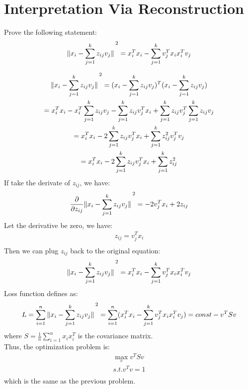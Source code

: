 \documentclass[12pt]{article}
\begin{document}
\section{Interpretation Via Reconstruction}
Prove the following statement:
\begin{gather*}
    \norm*{x_i - \sum_{j=1}^{k}z_{ij}v_j}^2 = x_{i}^T x_{i} - \sum_{j=1}^{k}v_{j}^T x_{i} x_{i}^T v_{j} \\
\end{gather*}
\begin{qsolve}
    \begin{gather*}
        \norm*{x_i - \sum_{j=1}^{k}z_{ij}v_j}^2 = (x_i - \sum_{j=1}^{k}z_{ij}v_j)^T (x_i - \sum_{j=1}^{k}z_{ij}v_j) \\
        = x_i^T x_i - x_i^T \sum_{j=1}^{k}z_{ij}v_j - \sum_{j=1}^{k}z_{ij}v_j^T x_i + \sum_{j=1}^{k}z_{ij}v_j^T \sum_{j=1}^{k}z_{ij}v_j \\
        = x_i^T x_i - 2 \sum_{j=1}^{k}z_{ij}v_j^T x_i + \sum_{j=1}^{k}z_{ij}^2 v_j^T v_j \\
        = x_i^T x_i - 2 \sum_{j=1}^{k}z_{ij}v_j^T x_i + \sum_{j=1}^{k}z_{ij}^2 \\
    \end{gather*}
    If take the derivate of $z_{ij}$, we have:
    \begin{gather*}
        \frac{\partial}{\partial z_{ij}} \norm*{x_i - \sum_{j=1}^{k}z_{ij}v_j}^2 = -2 v_j^T x_i + 2 z_{ij} \\
    \end{gather*}
    \splitqsolve
    Let the derivative be zero, we have:
    \begin{gather*}
        z_{ij} = v_j^T x_i \\
    \end{gather*}
    Then we can plug $z_{ij}$ back to the original equation:
    \begin{gather*}
        \norm*{x_i - \sum_{j=1}^{k}z_{ij}v_j}^2 = x_{i}^T x_{i} - \sum_{j=1}^{k}v_{j}^T x_{i} x_{i}^T v_{j} \\
    \end{gather*}
    Loss function defines as:
    \begin{gather*}
        L = \sum_{i=1}^{n} \norm*{x_i - \sum_{j=1}^{k}z_{ij}v_j}^2        = \sum_{i=1}^{n} (x_{i}^T x_{i} - \sum_{j=1}^{k}v_{j}^T x_{i} x_{i}^T v_{j}) = const - v^T S v\\
    \end{gather*}
    where $S = \frac{1}{n} \sum_{i=1}^{n} x_{i} x_{i}^T$ is the covariance matrix.\\
    Thus, the optimization problem is:
    \begin{gather*}
        \max_{v} v^T S v \\
        s.t. v^T v = 1 \\
    \end{gather*}
    which is the same as the previous problem.
\end{qsolve}
\end{document}
